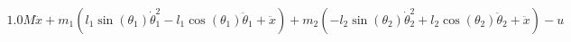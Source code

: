 \documentclass[preview]{standalone}
\begin{document}
\begin{align*}
1.0 M \ddot{x} + m_{1} \left(l_{1} \operatorname{sin}\left(\theta_{1}\right) \dot{\theta}_{1}^{2} - l_{1} \operatorname{cos}\left(\theta_{1}\right) \ddot{\theta}_{1} + \ddot{x}\right) + m_{2} \left(- l_{2} \operatorname{sin}\left(\theta_{2}\right) \dot{\theta}_{2}^{2} + l_{2} \operatorname{cos}\left(\theta_{2}\right) \ddot{\theta}_{2} + \ddot{x}\right) - u
\end{align*}
\end{document}
